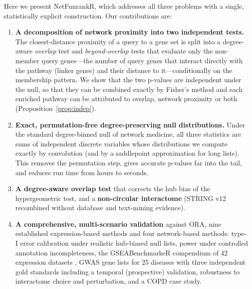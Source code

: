 Here we present NetFunrankR, which addresses all three problems with a single, statistically explicit construction. Our contributions are:
\begin{enumerate}[leftmargin=*,itemsep=2pt]
\item \textbf{A decomposition of network proximity into two independent tests.} The closest-distance proximity of a query to a gene set is split into a degree-aware \emph{overlap} test and \emph{beyond-overlap} tests that evaluate only the non-member query genes---the number of query genes that interact directly with the pathway (linker genes) and their distance to it---conditionally on the membership pattern. We show that the two p-values are independent under the null, so that they can be combined exactly by Fisher's method and each enriched pathway can be attributed to overlap, network proximity or both (Proposition~\ref{prop:indep}).
\item \textbf{Exact, permutation-free degree-preserving null distributions.} Under the standard degree-binned null of network medicine, all three statistics are sums of independent discrete variables whose distributions we compute exactly by convolution (and by a saddlepoint approximation for long lists). This removes the permutation step, gives accurate p-values far into the tail, and reduces run time from hours to seconds.
\item \textbf{A degree-aware overlap test} that corrects the hub bias of the hypergeometric test, and a \textbf{non-circular interactome} (STRING v12 recombined without database and text-mining evidence).
\item \textbf{A comprehensive, multi-scenario validation} against ORA, nine established expression-based methods and four network-based methods: type-I error calibration under realistic hub-biased null lists, power under controlled annotation incompleteness, the GSEABenchmarkeR compendium of 42 expression datasets \citep{Geistlinger2021}, GWAS gene lists for 25 diseases with three independent gold standards including a temporal (prospective) validation, robustness to interactome choice and perturbation, and a COPD case study.
\end{enumerate}
